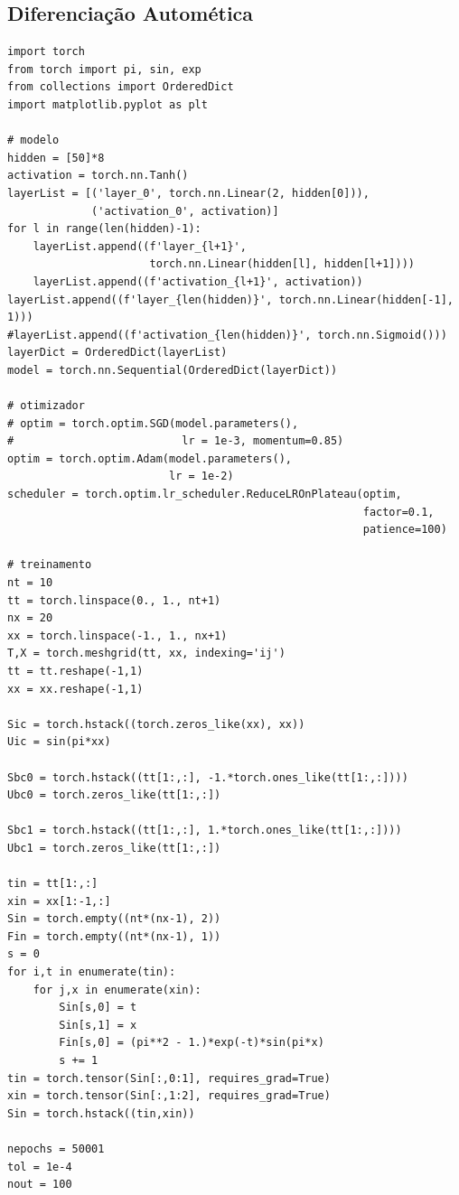 \subsection{Diferenciação Automética}

\begin{lstlisting}[caption=mlp\_calor\_autograd.py]
import torch
from torch import pi, sin, exp
from collections import OrderedDict
import matplotlib.pyplot as plt

# modelo
hidden = [50]*8
activation = torch.nn.Tanh()
layerList = [('layer_0', torch.nn.Linear(2, hidden[0])),
             ('activation_0', activation)]
for l in range(len(hidden)-1):
    layerList.append((f'layer_{l+1}',
                      torch.nn.Linear(hidden[l], hidden[l+1])))
    layerList.append((f'activation_{l+1}', activation))
layerList.append((f'layer_{len(hidden)}', torch.nn.Linear(hidden[-1], 1)))
#layerList.append((f'activation_{len(hidden)}', torch.nn.Sigmoid()))
layerDict = OrderedDict(layerList)
model = torch.nn.Sequential(OrderedDict(layerDict))

# otimizador
# optim = torch.optim.SGD(model.parameters(),
#                          lr = 1e-3, momentum=0.85)
optim = torch.optim.Adam(model.parameters(),
                         lr = 1e-2)
scheduler = torch.optim.lr_scheduler.ReduceLROnPlateau(optim,
                                                       factor=0.1,
                                                       patience=100)

# treinamento
nt = 10
tt = torch.linspace(0., 1., nt+1)
nx = 20
xx = torch.linspace(-1., 1., nx+1)
T,X = torch.meshgrid(tt, xx, indexing='ij')
tt = tt.reshape(-1,1)
xx = xx.reshape(-1,1)

Sic = torch.hstack((torch.zeros_like(xx), xx))
Uic = sin(pi*xx)

Sbc0 = torch.hstack((tt[1:,:], -1.*torch.ones_like(tt[1:,:])))
Ubc0 = torch.zeros_like(tt[1:,:])

Sbc1 = torch.hstack((tt[1:,:], 1.*torch.ones_like(tt[1:,:])))
Ubc1 = torch.zeros_like(tt[1:,:])

tin = tt[1:,:]
xin = xx[1:-1,:]
Sin = torch.empty((nt*(nx-1), 2))
Fin = torch.empty((nt*(nx-1), 1))
s = 0
for i,t in enumerate(tin):
    for j,x in enumerate(xin):
        Sin[s,0] = t
        Sin[s,1] = x
        Fin[s,0] = (pi**2 - 1.)*exp(-t)*sin(pi*x)
        s += 1
tin = torch.tensor(Sin[:,0:1], requires_grad=True)
xin = torch.tensor(Sin[:,1:2], requires_grad=True)
Sin = torch.hstack((tin,xin))

nepochs = 50001
tol = 1e-4
nout = 100


\end{lstlisting}
